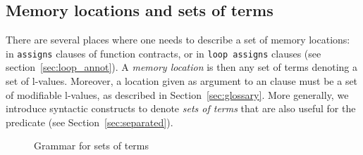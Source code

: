 \subsection{Memory locations and sets of terms}
\label{sec:locations}

There are several places where one needs to describe a set of memory
locations: in \lstinline|assigns| clauses of function contracts, or
in \lstinline|loop assigns| clauses (see section~\ref{sec:loop_annot}).
A \emph{memory location} is then any set of terms denoting a set of
l-values. Moreover, a location given as argument to
an \assigns{} clause must be a set of modifiable l-values, as described in
Section~\ref{sec:glossary}. 
More generally, we introduce syntactic constructs to denote \emph{sets of
  terms} that are also useful for the \separated predicate (see Section~\ref{sec:separated}).

\begin{figure}
  \begin{cadre}
      
    \end{cadre}
  \caption{Grammar for sets of terms}
\label{fig:gram:locations}
\end{figure}

